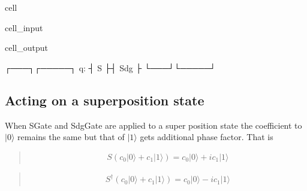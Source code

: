 \documentclass[letterpaper,10pt,english]{jupyterBook}
\begin{document}
\begin{sphinxuseclass}{cell}\begin{sphinxVerbatimInput}

\begin{sphinxuseclass}{cell_input}
\begin{sphinxVerbatim}[commandchars=\\\{\}]
   
\end{sphinxVerbatim}

\end{sphinxuseclass}\end{sphinxVerbatimInput}
\begin{sphinxVerbatimOutput}

\begin{sphinxuseclass}{cell_output}
\begin{sphinxVerbatim}[commandchars=\\\{\}]
   ┌───┐┌─────┐
q: ┤ S ├┤ Sdg ├
   └───┘└─────┘
\end{sphinxVerbatim}

\end{sphinxuseclass}\end{sphinxVerbatimOutput}

\end{sphinxuseclass}

\subsection{Acting on a superposition state}
\label{\detokenize{q1gates/s:acting-on-a-superposition-state}}
\sphinxAtStartPar
When SGate and SdgGate are applied to a super position state the coefficient to \(|0\rangle\) remains the same but that of \(|1\rangle\) gets additional phase factor.  That is
\begin{quote}
\begin{equation}\label{equation:q1gates/s:S-on-superpos}
\begin{split}
S \left (c_0 |0\rangle + c_1 |1\rangle\right) = c_0 |0\rangle + i c_1 |1\rangle
\end{split}
\end{equation}\end{quote}
\begin{quote}
\begin{equation}\label{equation:q1gates/s:Sdg-on-superpos}
\begin{split}
S^\dagger \left (c_0 |0\rangle + c_1 |1\rangle\right) = c_0 |0\rangle - i c_1 |1\rangle
\end{split}
\end{equation}\end{quote}
\end{document}
